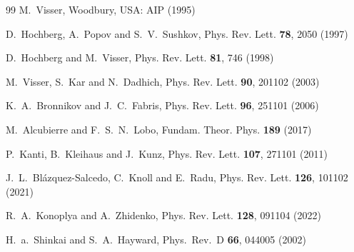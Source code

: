 \documentclass[twocolumn,showpacs,preprintnumbers,amsmath,amssymb,floatfix]{revtex4-1}
\begin{document}
\begin{thebibliography}{99}
  M.~Visser,
  Woodbury, USA: AIP (1995)

D.~Hochberg, A.~Popov and S.~V.~Sushkov,
Phys. Rev. Lett. \textbf{78}, 2050 (1997)

D.~Hochberg and M.~Visser,
Phys. Rev. Lett. \textbf{81}, 746 (1998)

M.~Visser, S.~Kar and N.~Dadhich,
Phys. Rev. Lett. \textbf{90}, 201102 (2003)

K.~A.~Bronnikov and J.~C.~Fabris,
Phys. Rev. Lett. \textbf{96}, 251101 (2006)

M.~Alcubierre and F.~S.~N.~Lobo,
Fundam. Theor. Phys. \textbf{189} (2017) 

P.~Kanti, B.~Kleihaus and J.~Kunz,
Phys. Rev. Lett. \textbf{107}, 271101 (2011)

J.~L.~Bl\'azquez-Salcedo, C.~Knoll and E.~Radu,
Phys. Rev. Lett. \textbf{126}, 101102 (2021)

R.~A.~Konoplya and A.~Zhidenko,
Phys. Rev. Lett. \textbf{128}, 091104 (2022)

  H.~a.~Shinkai and S.~A.~Hayward,
  Phys.\ Rev.\ D {\bf 66}, 044005 (2002)


\end{thebibliography}
\end{document}
